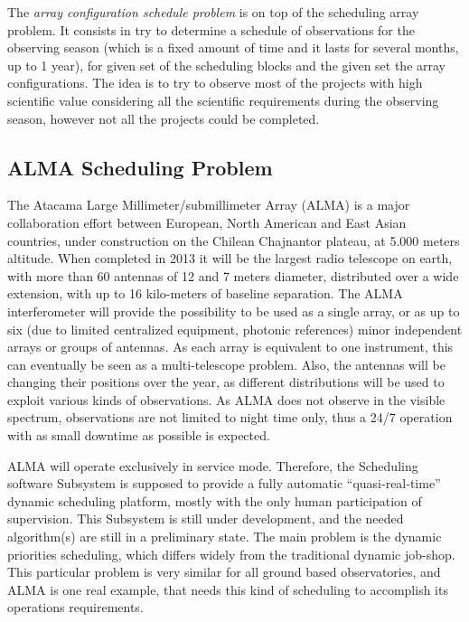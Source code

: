 \documentclass[11pt]{article}
\begin{document}
The \textit{array configuration schedule problem} is on top of the scheduling array problem. It consists in try to determine a schedule of observations for the observing season (which is a fixed amount of time and it lasts for several months, up to 1 year), for given set of the scheduling blocks and the given set the array configurations. The idea is to try to observe most of the projects with high scientific value considering all the scientific requirements during the observing season, however not all the projects could be completed.


\subsection{ALMA Scheduling Problem}
The Atacama Large Millimeter/submillimeter Array (ALMA) is a major collaboration effort between European, North American and East Asian countries, under construction on the Chilean Chajnantor plateau, at 5.000 meters altitude. When completed in 2013 it will be the largest radio telescope on earth, with more than 60 antennas of 12 and 7 meters diameter, distributed over a wide extension, with up to 16 kilo-meters of baseline separation. The ALMA interferometer will provide the possibility to be used as a single array, or as up to six (due to limited centralized equipment, photonic references) minor independent arrays or groups of antennas. As each array is equivalent to one instrument, this can eventually be seen as a multi-telescope problem. Also, the antennas will be changing their positions over the year, as different distributions will be used to exploit various kinds of observations. As ALMA does not observe in the visible spectrum, observations are not limited to night time only, thus a 24/7 operation with as small downtime as possible is expected. 

ALMA will operate exclusively in service mode. Therefore, the Scheduling software Subsystem is supposed to provide a fully automatic “quasi-real-time” dynamic scheduling platform, mostly with the only human participation of supervision. This Subsystem is still under development, and the needed algorithm(s) are still in a preliminary state. The main problem is the dynamic priorities scheduling, which differs widely from the traditional dynamic job-shop. This particular problem is very similar for all ground based observatories, and ALMA is one real example, that needs this kind of scheduling to accomplish its operations requirements.
\end{document}
